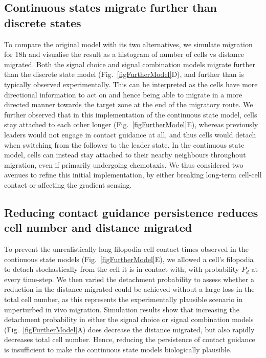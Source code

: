 \documentclass[review]{elsarticle}
\begin{document}
\subsection{Continuous states migrate further than discrete states}
To compare the original model with its two alternatives, we simulate migration for 18h and visualise the result as a histogram of number of cells vs distance migrated. Both the signal choice and signal combination models migrate further than the discrete state model (Fig.~\ref{figFurtherModel}D), and further than is typically observed experimentally. This can be interpreted as the cells have more directional information to act on and hence being able to migrate in a more directed manner towards the target zone at the end of the migratory route. We further observed that in this implementation of the continuous state model, cells stay attached to each other longer (Fig.~\ref{figFurtherModel}E), whereas previously leaders would not engage in contact guidance at all, and thus cells would detach when switching from the follower to the leader state. In the continuous state model, cells can instead stay attached to their nearby neighbours throughout migration, even if primarily undergoing chemotaxis. We thus considered two avenues to refine this initial implementation, by either breaking long-term cell-cell contact or affecting the gradient sensing. %

\subsection{Reducing contact guidance persistence reduces cell number and distance migrated}
To prevent the unrealistically long filopodia-cell contact times observed in the continuous state models (Fig.~\ref{figFurtherModel}E), we allowed a cell's filopodia to detach stochastically from the cell it is in contact with, with probability $P_d$ at every time-step. We then varied the detachment probability to assess whether a reduction in the distance migrated could be achieved without a large loss in the total cell number, as this represents the experimentally plausible scenario in unperturbed in vivo migration. Simulation results show that increasing the detachment probability in either the signal choice or signal combination models (Fig.~\ref{figFurtherModel}A) does decrease the distance migrated, but also rapidly decreases total cell number. Hence, reducing the persistence of contact guidance is insufficient to make the continuous state models biologically plausible.
\end{document}
